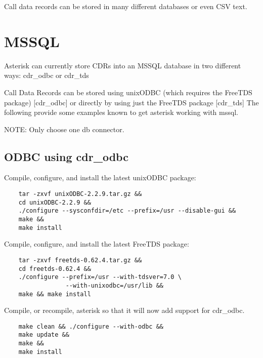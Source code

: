 Call data records can be stored in many different databases or even CSV text.

\section{MSSQL}

	Asterisk can currently store CDRs into an MSSQL database in
	two different ways:  cdr\_odbc or cdr\_tds
	
	Call Data Records can be stored using unixODBC (which requires
	the FreeTDS package) [cdr\_odbc] or directly by using just the
	FreeTDS package [cdr\_tds]  The following provide some
	examples known to get asterisk working with mssql.

	NOTE:  Only choose one db connector.

\subsection{ODBC using cdr\_odbc}
	Compile, configure, and install the latest unixODBC package:
\begin{astlisting}
\begin{verbatim}
	tar -zxvf unixODBC-2.2.9.tar.gz &&
	cd unixODBC-2.2.9 &&
	./configure --sysconfdir=/etc --prefix=/usr --disable-gui &&
	make &&
	make install
\end{verbatim}
\end{astlisting}

	Compile, configure, and install the latest FreeTDS package:
\begin{astlisting}
\begin{verbatim}
	tar -zxvf freetds-0.62.4.tar.gz &&
	cd freetds-0.62.4 &&
	./configure --prefix=/usr --with-tdsver=7.0 \
                 --with-unixodbc=/usr/lib &&
	make && make install
\end{verbatim}
\end{astlisting}

	Compile, or recompile, asterisk so that it will now add support
	for cdr\_odbc.
\begin{astlisting}
\begin{verbatim}
	make clean && ./configure --with-odbc &&
	make update &&
	make &&
	make install
\end{verbatim}
\end{astlisting}


